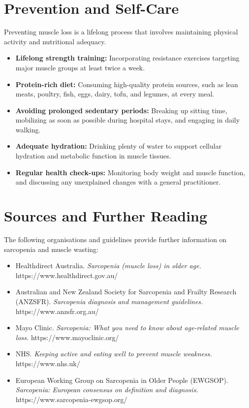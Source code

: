 \section*{Prevention and Self-Care}
Preventing muscle loss is a lifelong process that involves maintaining physical activity and nutritional adequacy.
\begin{itemize}
    \item \textbf{Lifelong strength training:} Incorporating resistance exercises targeting major muscle groups at least twice a week.
    \item \textbf{Protein-rich diet:} Consuming high-quality protein sources, such as lean meats, poultry, fish, eggs, dairy, tofu, and legumes, at every meal.
    \item \textbf{Avoiding prolonged sedentary periods:} Breaking up sitting time, mobilizing as soon as possible during hospital stays, and engaging in daily walking.
    \item \textbf{Adequate hydration:} Drinking plenty of water to support cellular hydration and metabolic function in muscle tissues.
    \item \textbf{Regular health check-ups:} Monitoring body weight and muscle function, and discussing any unexplained changes with a general practitioner.
\end{itemize}

\section*{Sources and Further Reading}
The following organisations and guidelines provide further information on sarcopenia and muscle wasting:
\begin{itemize}
    \item Healthdirect Australia. \textit{Sarcopenia (muscle loss) in older age.} https://www.healthdirect.gov.au/
    \item Australian and New Zealand Society for Sarcopenia and Frailty Research (ANZSFR). \textit{Sarcopenia diagnosis and management guidelines.} https://www.anzsfr.org.au/
    \item Mayo Clinic. \textit{Sarcopenia: What you need to know about age-related muscle loss.} https://www.mayoclinic.org/
    \item NHS. \textit{Keeping active and eating well to prevent muscle weakness.} https://www.nhs.uk/
    \item European Working Group on Sarcopenia in Older People (EWGSOP). \textit{Sarcopenia: European consensus on definition and diagnosis.} https://www.sarcopenia-ewgsop.org/
\end{itemize}
